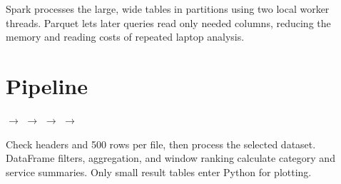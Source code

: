 \documentclass[10pt,a4paper]{article}
\begin{document}
Spark processes the large, wide tables in partitions using two local worker threads. Parquet lets later queries read only needed columns, reducing the memory and reading costs of repeated laptop analysis.

\section{Pipeline}
\begin{center}\small
{} $\rightarrow$
 $\rightarrow$
 $\rightarrow$
 $\rightarrow$
\end{center}
Check headers and 500 rows per file, then process the selected dataset. DataFrame filters, aggregation, and window ranking calculate category and service summaries. Only small result tables enter Python for plotting.
\end{document}
